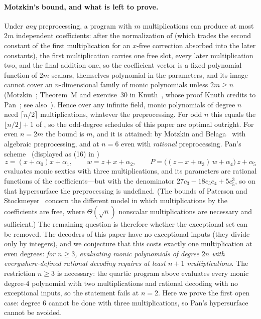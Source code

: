 \paragraph{Motzkin's bound, and what is left to prove.}
Under \emph{any} preprocessing, a program with $m$ multiplications can produce at
most $2m$ independent coefficients: after the normalization of 
(which trades the second constant of the first multiplication for an $x$-free
correction absorbed into the later constants), the first multiplication carries one
free slot, every later multiplication two, and the final addition one, so the
coefficient vector is a fixed polynomial function of $2m$ scalars, themselves
polynomial in the parameters, and its image cannot cover an $n$-dimensional family of monic polynomials
unless $2m\ge n$ (Motzkin~\cite{motzkin1955evaluation}; Theorem~M and exercise~30
in Knuth~\cite[\S4.6.4]{knuth1997seminumerical}, whose proof Knuth credits to
Pan~\cite{pan1966methods}; see also~\cite[Chapter~5]{burgisser1997algebraic}).
Hence over any infinite field, monic polynomials of degree $n$ need $\lceil n/2\rceil$
multiplications, whatever the preprocessing.
For odd $n$ this equals the $\lfloor n/2\rfloor+1$ of , so the
odd-degree schedules of this paper are optimal outright.
For even $n=2m$ the bound is $m$, and it is attained: by Motzkin and
Belaga~\cite{belaga1958some,pan1966methods} with algebraic preprocessing, and at
$n=6$ even with \emph{rational} preprocessing.  Pan's scheme~\cite{pan1961schemes}
(displayed as (16) in \cite[\S4.6.4]{knuth1997seminumerical})
\[
   z=(x+\alpha_0)x+\alpha_1,\qquad w=z+x+\alpha_2,\qquad
   P=\bigl((z-x+\alpha_3)\,w+\alpha_4\bigr)\,z+\alpha_5
\]
evaluates monic sextics with three multiplications, and its parameters are
rational functions of the coefficients---but with the denominator
$27c_3-18c_5c_4+5c_5^3$, so on that hypersurface the preprocessing is undefined.
(The bounds of Paterson and Stockmeyer~\cite{paterson1973evaluation} concern the
different model in which multiplications by the coefficients are free, where
$\Theta(\sqrt n)$ nonscalar multiplications are necessary and sufficient.)
The remaining question is therefore whether the exceptional set can be removed.
The decoders of this paper have no exceptional inputs (they divide only by
integers), and we conjecture that this costs exactly one multiplication at even
degrees: \emph{for $n\ge3$, evaluating monic polynomials of degree $2n$ with
everywhere-defined rational decoding requires at least $n+1$ multiplications}.
The restriction $n\ge3$ is necessary: the quartic program above evaluates every
monic degree-$4$ polynomial with two multiplications and rational decoding with no
exceptional inputs, so the statement fails at $n=2$.
Here we prove the first open case: degree $6$ cannot be done with three
multiplications, so Pan's hypersurface cannot be avoided.

